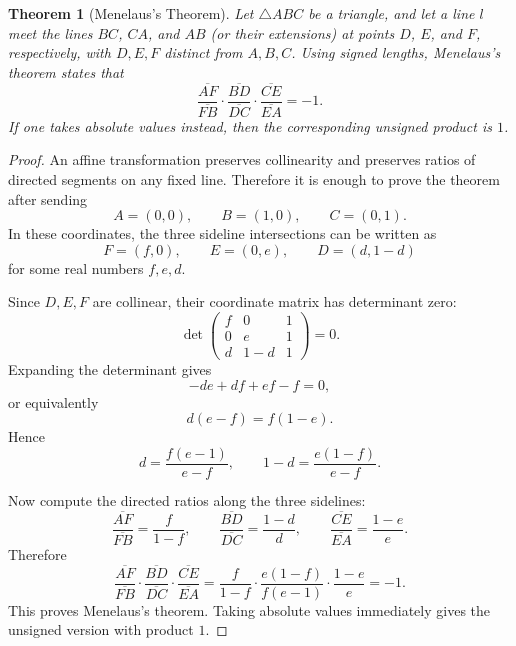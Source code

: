 \documentclass[11pt]{article}
\newtheorem{theorem}{Theorem}
\begin{document}
\begin{theorem}[Menelaus's Theorem]
\label{thm:menelaus}
Let $\triangle ABC$ be a triangle, and let a line $l$ meet the lines $BC$,
$CA$, and $AB$ (or their extensions) at points $D$, $E$, and $F$,
respectively, with $D,E,F$ distinct from $A,B,C$. Using signed lengths,
Menelaus's theorem states that
\[
\frac{\overline{AF}}{\overline{FB}}\cdot
\frac{\overline{BD}}{\overline{DC}}\cdot
\frac{\overline{CE}}{\overline{EA}}
=
-1.
\]
If one takes absolute values instead, then the corresponding unsigned product
is $1$.
\end{theorem}

\begin{proof}
An affine transformation preserves collinearity and preserves ratios of
directed segments on any fixed line. Therefore it is enough to prove the
theorem after sending
\[
A=(0,0),\qquad B=(1,0),\qquad C=(0,1).
\]
In these coordinates, the three sideline intersections can be written as
\[
F=(f,0),\qquad E=(0,e),\qquad D=(d,1-d)
\]
for some real numbers $f,e,d$.

Since $D,E,F$ are collinear, their coordinate matrix has determinant zero:
\[
\det
\begin{pmatrix}
f & 0 & 1 \\
0 & e & 1 \\
d & 1-d & 1
\end{pmatrix}
=0.
\]
Expanding the determinant gives
\[
-de+df+ef-f=0,
\]
or equivalently
\[
d(e-f)=f(1-e).
\]
Hence
\[
d=\frac{f(e-1)}{e-f},
\qquad
1-d=\frac{e(1-f)}{e-f}.
\]

Now compute the directed ratios along the three sidelines:
\[
\frac{\overline{AF}}{\overline{FB}}=\frac{f}{1-f},
\qquad
\frac{\overline{BD}}{\overline{DC}}=\frac{1-d}{d},
\qquad
\frac{\overline{CE}}{\overline{EA}}=\frac{1-e}{e}.
\]
Therefore
\[
\frac{\overline{AF}}{\overline{FB}}\cdot
\frac{\overline{BD}}{\overline{DC}}\cdot
\frac{\overline{CE}}{\overline{EA}}
=
\frac{f}{1-f}\cdot
\frac{e(1-f)}{f(e-1)}\cdot
\frac{1-e}{e}
=
-1.
\]
This proves Menelaus's theorem. Taking absolute values immediately gives the
unsigned version with product $1$.
\end{proof}
\end{document}
